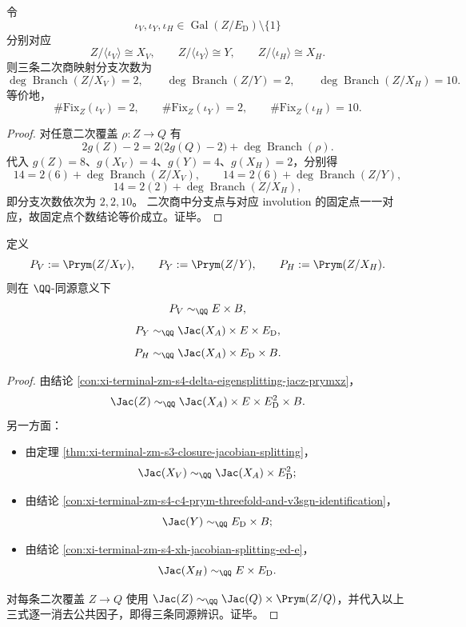 \begin{conclusion}\label{con:xi-terminal-zm-s4-v4-ed-involution-quotients-branch-2210}
令
\[
\iota_V,\iota_Y,\iota_H\in \operatorname{Gal}(Z/E_{\mathrm D})\setminus\{1\}
\]
分别对应
\[
Z/\langle\iota_V\rangle\cong X_V,\qquad
Z/\langle\iota_Y\rangle\cong Y,\qquad
Z/\langle\iota_H\rangle\cong X_H.
\]
则三条二次商映射分支次数为
\[
\deg\operatorname{Branch}(Z/X_V)=2,\qquad
\deg\operatorname{Branch}(Z/Y)=2,\qquad
\deg\operatorname{Branch}(Z/X_H)=10.
\]
等价地，
\[
\#\mathrm{Fix}_Z(\iota_V)=2,\qquad
\#\mathrm{Fix}_Z(\iota_Y)=2,\qquad
\#\mathrm{Fix}_Z(\iota_H)=10.
\]
\end{conclusion}
\begin{proof}
对任意二次覆盖 \(\rho:Z\to Q\) 有
\[
2g(Z)-2=2\bigl(2g(Q)-2\bigr)+\deg\operatorname{Branch}(\rho).
\]
代入 \(g(Z)=8\)、\(g(X_V)=4\)、\(g(Y)=4\)、\(g(X_H)=2\)，分别得
\[
14=2(6)+\deg\operatorname{Branch}(Z/X_V),\qquad
14=2(6)+\deg\operatorname{Branch}(Z/Y),
\]
\[
14=2(2)+\deg\operatorname{Branch}(Z/X_H),
\]
即分支次数依次为 \(2,2,10\)。
二次商中分支点与对应 involution 的固定点一一对应，故固定点个数结论等价成立。证毕。
\end{proof}

\begin{conclusion}\label{con:xi-terminal-zm-s4-v4-ed-three-prym-identifications}
定义
\[
P_V:=\Prym(Z/X_V),\qquad
P_Y:=\Prym(Z/Y),\qquad
P_H:=\Prym(Z/X_H).
\]
则在 \(\QQ\)-同源意义下
\[
P_V\sim_{\QQ}E\times B,
\]
\[
P_Y\sim_{\QQ}\Jac(X_A)\times E\times E_{\mathrm D},
\]
\[
P_H\sim_{\QQ}\Jac(X_A)\times E_{\mathrm D}\times B.
\]
\end{conclusion}
\begin{proof}
由结论 \ref{con:xi-terminal-zm-s4-delta-eigensplitting-jacz-prymxz}，
\[
\Jac(Z)\sim_{\QQ}\Jac(X_A)\times E\times E_{\mathrm D}^{2}\times B.
\]
另一方面：
\begin{itemize}
  \item 由定理 \ref{thm:xi-terminal-zm-s3-closure-jacobian-splitting}，
  \[
  \Jac(X_V)\sim_{\QQ}\Jac(X_A)\times E_{\mathrm D}^{2};
  \]
  \item 由结论 \ref{con:xi-terminal-zm-s4-c4-prym-threefold-and-v3sgn-identification}，
  \[
  \Jac(Y)\sim_{\QQ}E_{\mathrm D}\times B;
  \]
  \item 由结论 \ref{con:xi-terminal-zm-s4-xh-jacobian-splitting-ed-e}，
  \[
  \Jac(X_H)\sim_{\QQ}E\times E_{\mathrm D}.
  \]
\end{itemize}
对每条二次覆盖 \(Z\to Q\) 使用
\(
\Jac(Z)\sim_{\QQ}\Jac(Q)\times \Prym(Z/Q)
\)，并代入以上三式逐一消去公共因子，即得三条同源辨识。证毕。
\end{proof}

\endinput
